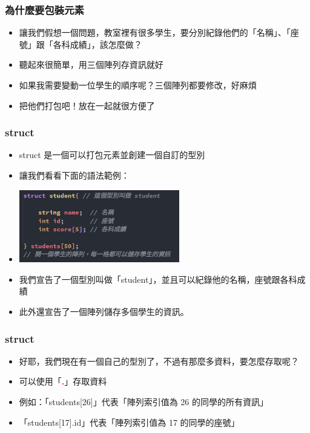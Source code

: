 \documentclass[mathserif]{beamer}
\begin{document}
\begin{frame}
    \frametitle{為什麼要包裝元素}
    \begin{itemize}
        \item 讓我們假想一個問題，教室裡有很多學生，要分別紀錄他們的「名稱」、「座號」跟「各科成績」，該怎麼做？
        \item<2-> 聽起來很簡單，用三個陣列存資訊就好
        \item<3-> 如果我需要變動一位學生的順序呢？三個陣列都要修改，好麻煩
        \item<4-> 把他們打包吧！放在一起就很方便了
    \end{itemize}
\end{frame}

\begin{frame}
    \frametitle{struct}
    \begin{itemize}
        \item struct 是一個可以打包元素並創建一個自訂的型別
        \item 讓我們看看下面的語法範例：
        \item \includegraphics[width=7.0cm]{img/5-1.png}
        \item<2-> 我們宣告了一個型別叫做「student」，並且可以紀錄他的名稱，座號跟各科成績
        \item<2-> 此外還宣告了一個陣列儲存多個學生的資訊。
    \end{itemize}
\end{frame}

\begin{frame}
    \frametitle{struct}
    \begin{itemize}
        \item 好耶，我們現在有一個自己的型別了，不過有那麼多資料，要怎麼存取呢？
        \item 可以使用「\textbf{\textcolor{red}{.}}」存取資料
        \item<2-> 例如：「students[26]」代表「陣列索引值為 26 的同學的所有資訊」
        \item<2-> 「students[17].id」代表「陣列索引值為 17 的同學的座號」
    \end{itemize}
\end{frame}
\end{document}
